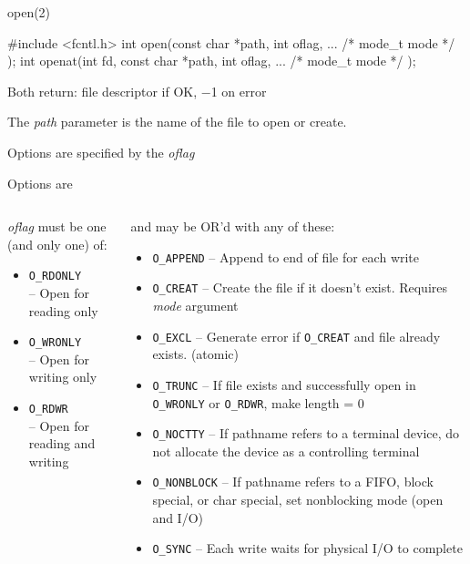 \documentclass[newPxFont,sthlmFooter,nooffset]{beamer}
\begin{document}
\begin{frame}[containsverbatim,t]{open(2)}

\begin{codedef}
#include <fcntl.h>
int open(const char *path, int oflag, ... /* mode_t mode */ );
int openat(int fd, const char *path, int oflag, ... /* mode_t mode */ );
\end{codedef}
Both return: file descriptor if OK, −1 on error
\bigskip

The \textit{path} parameter is the name of the file to open or create.
\bigskip

Options are specified by the \textit{oflag}
\end{frame}

\begin{frame}[t]{Options are}
\begin{columns}[t]
\begin{column}{0.30\linewidth}
\small \textit{oflag} must be one (and only one) of:
\footnotesize
\begin{itemize}
	\item \texttt{O\_RDONLY}\\ -- Open for reading only
	\item \texttt{O\_WRONLY}\\ -- Open for writing only
	\item \texttt{O\_RDWR}\\ -- Open for reading and writing
\end{itemize}
\end{column}
\begin{column}{0.70\linewidth}
\small and may be OR'd with any of these:
\footnotesize
\begin{itemize}
	\item \texttt{O\_APPEND} -- Append to end of file for each write
	\item \texttt{O\_CREAT} -- Create the file if it doesn't exist. Requires
		{\em mode} argument
	\item \texttt{O\_EXCL} -- Generate error if \texttt{O\_CREAT} and file
		already exists. (atomic)
	\item \texttt{O\_TRUNC} -- If file exists and successfully open in
		\texttt{O\_WRONLY} or \texttt{O\_RDWR}, make length = 0
	\item \texttt{O\_NOCTTY} -- If pathname refers to a terminal device, do
		not allocate the device as a controlling terminal
	\item \texttt{O\_NONBLOCK} -- If pathname refers to a FIFO, block special,
		or char special, set nonblocking mode (open and I/O)
	\item \texttt{O\_SYNC} --  Each write waits for physical I/O to complete
\end{itemize}
\end{column}
\end{columns}
\end{frame}
\end{document}
